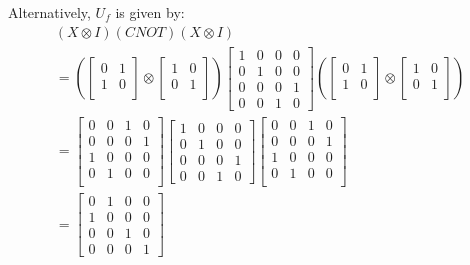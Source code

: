 \documentclass[conference]{IEEEtran}
\begin{document}
\begin{appendices}
Alternatively, $U_f$ is given by:
\begin{multline*}
(X \otimes I)(CNOT)(X \otimes I) \\
=
\left(
\begin{bmatrix}
    0 & 1 \\
    1 & 0 \\
\end{bmatrix}
\otimes
\begin{bmatrix}
    1 & 0 \\
    0 & 1 \\
\end{bmatrix}
\right)
\begin{bmatrix}
    1 & 0 & 0 & 0 \\
    0 & 1 & 0 & 0 \\
    0 & 0 & 0 & 1 \\
    0 & 0 & 1 & 0
\end{bmatrix}
\left(
\begin{bmatrix}
    0 & 1 \\
    1 & 0 \\
\end{bmatrix}
\otimes
\begin{bmatrix}
    1 & 0 \\
    0 & 1 \\
\end{bmatrix}
\right) \\
=
\begin{bmatrix}
    0 & 0 & 1 & 0\\
    0 & 0 & 0 & 1\\
    1 & 0 & 0 & 0\\
    0 & 1 & 0 & 0\\
\end{bmatrix}
\begin{bmatrix}
    1 & 0 & 0 & 0 \\
    0 & 1 & 0 & 0 \\
    0 & 0 & 0 & 1 \\
    0 & 0 & 1 & 0
\end{bmatrix}
\begin{bmatrix}
    0 & 0 & 1 & 0\\
    0 & 0 & 0 & 1\\
    1 & 0 & 0 & 0\\
    0 & 1 & 0 & 0\\
\end{bmatrix} \\
=
\begin{bmatrix}
    0 & 1 & 0 & 0 \\
    1 & 0 & 0 & 0 \\
    0 & 0 & 1 & 0 \\
    0 & 0 & 0 & 1
\end{bmatrix}
\end{multline*}


\end{appendices}
\end{document}
